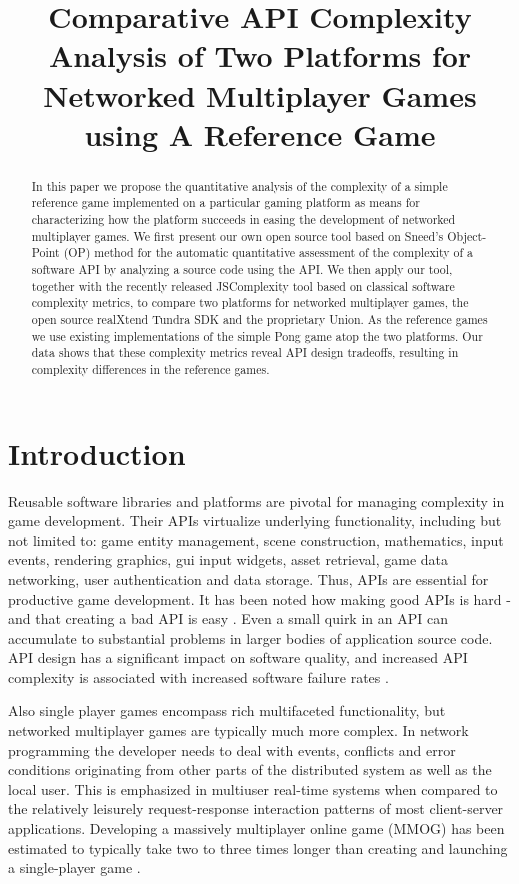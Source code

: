 \documentclass[conference]{IEEEtran}
\title{Comparative API Complexity Analysis of Two Platforms for Networked Multiplayer Games using A Reference Game}
\author{
  \IEEEauthorblockN{
    Toni Alatalo\IEEEauthorrefmark{1}\IEEEauthorrefmark{2}
    Erno Kuusela\IEEEauthorrefmark{1}\IEEEauthorrefmark{2} 
    Rauli Puuperä\IEEEauthorrefmark{1}\IEEEauthorrefmark{2}
    and Timo Ojala\IEEEauthorrefmark{1}
  }
  \IEEEauthorblockA{\IEEEauthorrefmark{1}Department of Computer Science and Engineering, University of Oulu}
  \IEEEauthorblockA{\IEEEauthorrefmark{2}Playsign Ltd., Oulu, Finland}
}
\begin{document}
\maketitle
\begin{abstract}
In this paper we propose the quantitative analysis of the complexity
of a simple reference game implemented on a particular gaming platform
as means for characterizing how the platform succeeds in easing the
development of networked multiplayer games. We first present our own
open source tool based on Sneed’s Object-Point (OP) method for the
automatic quantitative assessment of the complexity of a software API
by analyzing a source code using the API. We then apply our tool,
together with the recently released JSComplexity tool based on
classical software complexity metrics, to compare two platforms for
networked multiplayer games, the open source realXtend Tundra SDK and
the proprietary Union. As the reference games we use existing
implementations of the simple Pong game atop the two platforms. Our
data shows that these complexity metrics reveal API design tradeoffs,
resulting in complexity differences in the reference games.
\end{abstract}

\section{Introduction}
Reusable software libraries and platforms are pivotal for managing
complexity in game development. Their APIs virtualize underlying
functionality, including but not limited to: game entity management,
scene construction, mathematics, input events, rendering graphics, gui
input widgets, asset retrieval, game data networking, user
authentication and data storage. Thus, APIs are essential for
productive game development. It has been noted how making good APIs is
hard - and that creating a bad API is easy \cite{api-matters}. Even a
small quirk in an API can accumulate to substantial problems in larger
bodies of application source code. API design has a significant impact
on software quality, and increased API complexity is associated with
increased software failure rates \cite{cmu-api_failures}.

Also single player games encompass rich multifaceted functionality,
but networked multiplayer games are typically much more complex. In
network programming the developer needs to deal with events, conflicts
and error conditions originating from other parts of the distributed
system as well as the local user. This is emphasized in multiuser
real-time systems when compared to the relatively leisurely
request-response interaction patterns of most client-server
applications. Developing a massively multiplayer online game (MMOG)
has been estimated to typically take two to three times longer than
creating and launching a single-player game \cite{middleware}.
\end{document}
